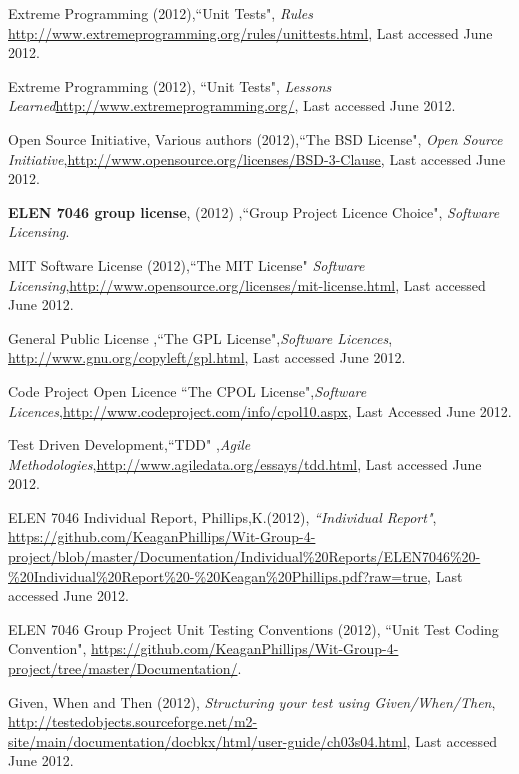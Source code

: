 \documentclass[a4paper,12pt]{Article}
\begin{document}
\begin{thebibliography}{99}



 Extreme Programming (2012),``Unit Tests", \textit{Rules} \url{http://www.extremeprogramming.org/rules/unittests.html}, Last accessed June 2012.

 Extreme Programming (2012), ``Unit Tests", \textit{Lessons Learned}\url{http://www.extremeprogramming.org/}, Last accessed June 2012.

 Open Source Initiative, Various authors (2012),``The BSD License", \textit{Open Source Initiative},\url{http://www.opensource.org/licenses/BSD-3-Clause}, Last accessed June 2012.

 \textbf{ELEN 7046 group license}, (2012) ,``Group Project Licence Choice", \textit{Software Licensing}.

MIT Software License (2012),``The MIT License" \textit{Software Licensing},\url{http://www.opensource.org/licenses/mit-license.html}, Last accessed June 2012.

 General Public License ,``The GPL License",\textit{Software Licences}, \url{http://www.gnu.org/copyleft/gpl.html}, Last accessed June 2012.

Code Project Open Licence ``The CPOL License",\textit{Software Licences},\url{http://www.codeproject.com/info/cpol10.aspx}, Last Accessed June 2012.

 Test Driven Development,``TDD" ,\textit{Agile Methodologies},\url{http://www.agiledata.org/essays/tdd.html}, Last accessed June 2012.

 ELEN 7046 Individual Report, 
Phillips,K.(2012), 
\textit{``Individual Report"},
\url{https://github.com/KeaganPhillips/Wit-Group-4-project/blob/master/Documentation/Individual%20Reports/ELEN7046%20-%20Individual%20Report%20-%20Keagan%20Phillips.pdf?raw=true}, Last accessed June 2012.

 ELEN 7046 Group Project Unit Testing Conventions (2012),
``Unit Test Coding Convention", 
 \url{https://github.com/KeaganPhillips/Wit-Group-4-project/tree/master/Documentation/}.

Given, When and Then (2012),
\textit{Structuring your test using Given/When/Then},
\url{http://testedobjects.sourceforge.net/m2-site/main/documentation/docbkx/html/user-guide/ch03s04.html}, Last accessed June 2012.


\end{thebibliography}
\end{document}
